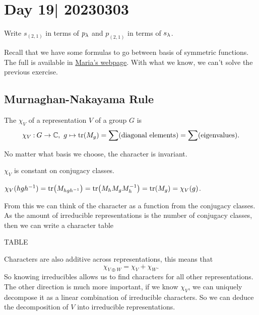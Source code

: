 \documentclass[12pt]{memoir}
\begin{document}
\section{Day 19| 20230303}

\begin{Ej}
    Write $s_{(2,1)}$ in terms of $p_\lambda$ and $p_{(2,1)}$ in terms of $s_\lambda$.
\end{Ej}

Recall that we have some formulas to go between basis of symmetric functions. The full is available in \href{http://www.mathematicalgemstones.com/gemstones/diamond/summary-symmetric-functions-transition-table/}{Maria's webpage}. With what we know, we can't solve the previous exercise.

\subsection{Murnaghan-Nakayama Rule}

\begin{Def}
    The  $\chi_V$ of a representation $V$ of a group $G$ is 
    $$\chi_V\mathbin{:} G\to\mathbb{C},\ g\mapsto \tr(M_g)=\sum(\text{diagonal elements})=\sum(\text{eigenvalues}).$$
\end{Def}
No matter what basis we choose, the character is invariant.

\begin{Lem}
        \item $\chi_V$ is constant on conjugacy classes.
\end{Lem}

\begin{ptcbp}
$\chi_V(hgh^{-1})=\tr(M_{hgh^{-1}})=\tr(M_hM_gM_{h}^{-1})=\tr(M_g)=\chi_V(g)$.
\end{ptcbp}

From this we can think of the character as a function from the conjugacy classes. As the amount of irreducible representations is the number of conjugacy classes, then we can write a character table
\begin{center}
    TABLE
\end{center}
Characters are also additive across representations, this means that 
$$\chi_{V\oplus W}=\chi_V+\chi_W.$$
So knowing irreducibles allows us to find characters for all other representations. The other direction is much more important, if we know $\chi_V$, we can uniquely decompose it as a linear combination of irreducible characters. So we can deduce the decomposition of $V$ into irreducible representations.
\end{document}

